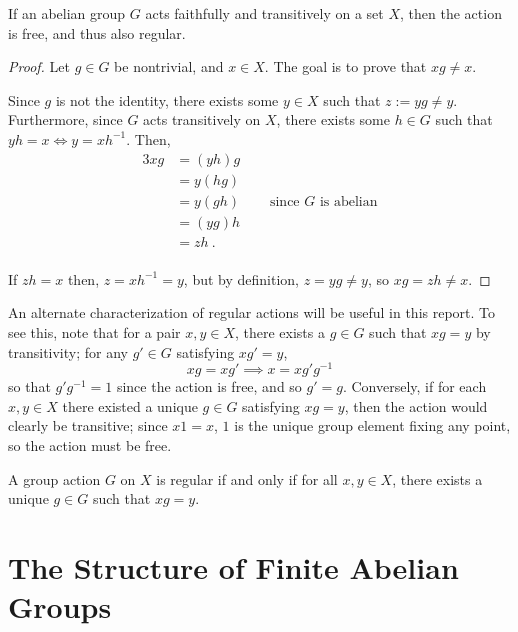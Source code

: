 \documentclass{report}
\begin{document}
    \begin{lem}\label{lem:faithful-transitive-abelian}
      If an abelian group $G$ acts faithfully and transitively on a set $X$,
      then the action is free, and thus also regular. \cite[Section 4.1,
      Exercise 3]{dummit-foote}
    \end{lem}

    \begin{proof}
      Let $g \in G$ be nontrivial, and $x \in X$.
      The goal is to prove that $xg \neq x$.

      Since $g$ is not the identity,
      there exists some $y \in X$ such that $z := yg \neq y$.
      Furthermore, since $G$ acts transitively on $X$,
      there exists some $h \in G$ such that $yh = x \iff y = xh^{-1}$.
      Then,
      \begin{alignat*}{3}
        xg &= (yh) g &\\
        &= y (hg) &\\
        &= y (gh) \quad&\text{ since $G$ is abelian}\\
        &= (yg) h &\\
        &= zh \ .&\\
      \end{alignat*}

      If $zh = x$ then, $z = xh^{-1} = y$,
      but by definition, $z = yg \neq y$,
      so $xg = zh \neq x$.
    \end{proof}

    An alternate characterization of regular actions will be useful in this
    report.  To see this, note that for a pair $x, y \in X$, there exists a $g
    \in G$ such that $xg = y$ by transitivity; for any $g' \in G$ satisfying
    $xg' = y$,
    $$
      xg = xg' \implies x = x g'g^{-1}
    $$
    so that $g'g^{-1} = 1$ since the action is free, and so $g' = g$.
    Conversely, if for each $x, y \in X$ there existed a unique $g \in G$
    satisfying $xg = y$, then the action would clearly be transitive; since $x 1
    = x$, $1$ is the unique group element fixing any point, so the action must
    be free.

    \begin{lem}\label{lem:regular-unique}
      A group action $G$ on $X$ is regular if and only if
      for all $x, y \in X$, there exists a unique $g \in G$
      such that $xg = y$.
    \end{lem}

  \section{The Structure of Finite Abelian Groups}
\end{document}
